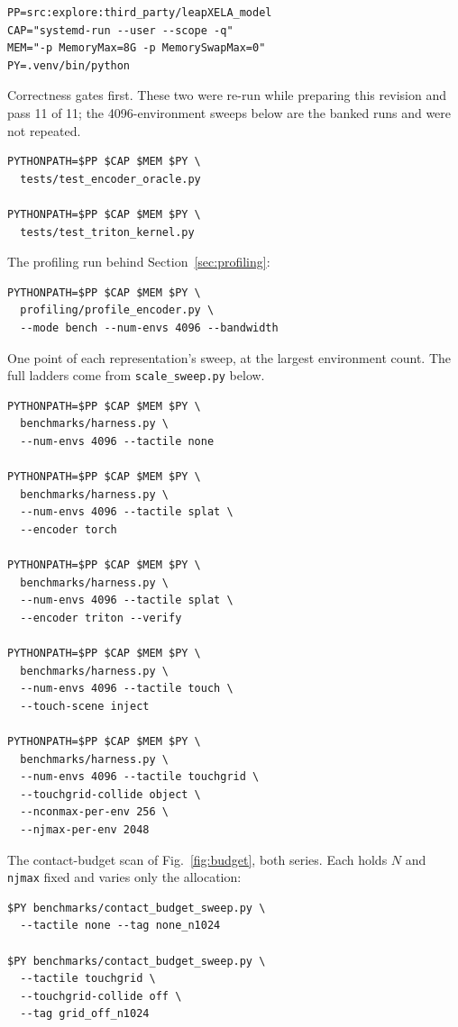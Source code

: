 \documentclass[journal]{IEEEtran}
\begin{document}
{\footnotesize
\begin{verbatim}
PP=src:explore:third_party/leapXELA_model
CAP="systemd-run --user --scope -q"
MEM="-p MemoryMax=8G -p MemorySwapMax=0"
PY=.venv/bin/python
\end{verbatim}
}

Correctness gates first. These two were re-run while preparing this revision and pass 11 of 11; the 4096-environment sweeps below are the banked runs and were not repeated.

{\footnotesize
\begin{verbatim}
PYTHONPATH=$PP $CAP $MEM $PY \
  tests/test_encoder_oracle.py

PYTHONPATH=$PP $CAP $MEM $PY \
  tests/test_triton_kernel.py
\end{verbatim}
}

The profiling run behind Section~\ref{sec:profiling}:

{\footnotesize
\begin{verbatim}
PYTHONPATH=$PP $CAP $MEM $PY \
  profiling/profile_encoder.py \
  --mode bench --num-envs 4096 --bandwidth
\end{verbatim}
}

One point of each representation's sweep, at the largest environment count. The full ladders come from \texttt{scale\_sweep.py} below.

{\footnotesize
\begin{verbatim}
PYTHONPATH=$PP $CAP $MEM $PY \
  benchmarks/harness.py \
  --num-envs 4096 --tactile none

PYTHONPATH=$PP $CAP $MEM $PY \
  benchmarks/harness.py \
  --num-envs 4096 --tactile splat \
  --encoder torch

PYTHONPATH=$PP $CAP $MEM $PY \
  benchmarks/harness.py \
  --num-envs 4096 --tactile splat \
  --encoder triton --verify

PYTHONPATH=$PP $CAP $MEM $PY \
  benchmarks/harness.py \
  --num-envs 4096 --tactile touch \
  --touch-scene inject

PYTHONPATH=$PP $CAP $MEM $PY \
  benchmarks/harness.py \
  --num-envs 4096 --tactile touchgrid \
  --touchgrid-collide object \
  --nconmax-per-env 256 \
  --njmax-per-env 2048
\end{verbatim}
}

The contact-budget scan of Fig.~\ref{fig:budget}, both series. Each holds $N$ and \texttt{njmax} fixed and varies only the allocation:

{\footnotesize
\begin{verbatim}
$PY benchmarks/contact_budget_sweep.py \
  --tactile none --tag none_n1024

$PY benchmarks/contact_budget_sweep.py \
  --tactile touchgrid \
  --touchgrid-collide off \
  --tag grid_off_n1024
\end{verbatim}
}
\end{document}
